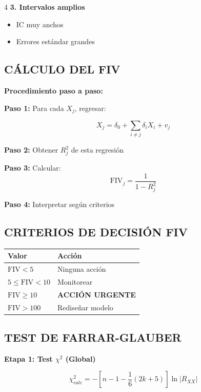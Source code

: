 \documentclass[6pt, landscape]{extarticle}
\newcommand{\FIV}{\text{FIV}}
\begin{document}
\begin{multicols*}{4}
\textbf{3. Intervalos amplios}
\begin{itemize}
    \item IC muy anchos
    \item Errores estándar grandes
\end{itemize}

\subsection{CÁLCULO DEL FIV}

\textbf{Procedimiento paso a paso:}

\textbf{Paso 1:} Para cada $X_j$, regresar:
\begin{formulabox}
\vspace{-3pt}
$$X_j = \delta_0 + \sum_{i \neq j} \delta_i X_i + v_j$$
\vspace{-3pt}
\end{formulabox}

\textbf{Paso 2:} Obtener $R_j^2$ de esta regresión

\textbf{Paso 3:} Calcular:
$$\FIV_j = \frac{1}{1-R_j^2}$$

\textbf{Paso 4:} Interpretar según criterios

\subsection{CRITERIOS DE DECISIÓN FIV}

\begin{center}
{\scriptsize
\begin{tabular}{@{}ll@{}}
\toprule
\textbf{Valor} & \textbf{Acción} \\
\midrule
$\FIV < 5$ & Ninguna acción \\
$5 \leq \FIV < 10$ & Monitorear \\
\rowcolor{WarningBox}
$\FIV \geq 10$ & \textbf{ACCIÓN URGENTE} \\
$\FIV > 100$ & Rediseñar modelo \\
\bottomrule
\end{tabular}
}
\end{center}

\subsection{TEST DE FARRAR-GLAUBER}

\textbf{Etapa 1: Test $\chi^2$ (Global)}

\begin{formulabox}
\vspace{-3pt}
$$\chi^2_{calc} = -\left[n - 1 - \frac{1}{6}(2k+5)\right] \ln|R_{XX}|$$
\vspace{-3pt}
\end{formulabox}


\end{multicols*}
\end{document}
